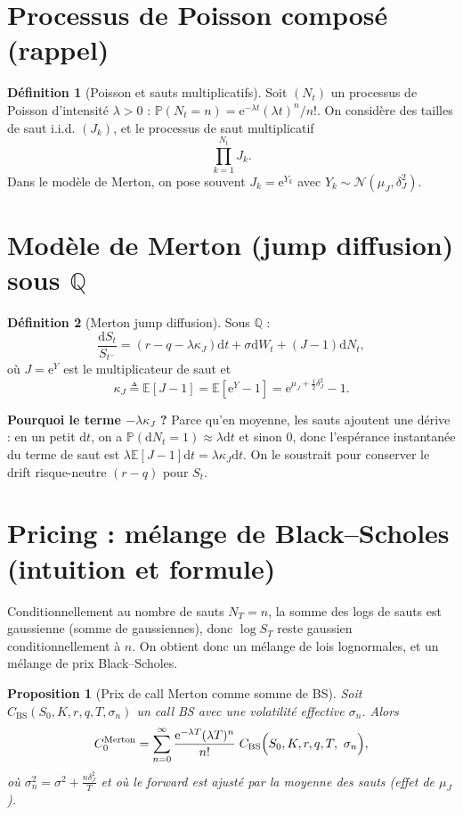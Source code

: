 \documentclass[11pt,a4paper]{report}
\newcommand{\dd}{\mathrm{d}}
\newcommand{\ee}{\mathrm{e}}
\newcommand{\E}{\mathbb{E}}
\newcommand{\Prob}{\mathbb{P}}
\newcommand{\Q}{\mathbb{Q}}
\newcommand{\1}{\mathbbm{1}}
\newcommand{\Normal}{\mathcal{N}}
\theoremstyle{definition}
\newtheorem{definition}{Définition}[chapter]
\theoremstyle{plain}
\newtheorem{proposition}{Proposition}[chapter]
\theoremstyle{remark}
\begin{document}
\section{Processus de Poisson composé (rappel)}
\begin{definition}[Poisson et sauts multiplicatifs]
Soit $(N_t)$ un processus de Poisson d'intensité $\lambda>0$ : $\Prob(N_t=n)=\ee^{-\lambda t}(\lambda t)^n/n!$.
On considère des tailles de saut i.i.d. $(J_k)$, et le processus de saut multiplicatif
\[
\prod_{k=1}^{N_t} J_k.
\]
Dans le modèle de Merton, on pose souvent $J_k=\ee^{Y_k}$ avec $Y_k\sim \Normal(\mu_J,\delta_J^2)$.
\end{definition}

\section{Modèle de Merton (jump diffusion) sous $\Q$}
\label{sec:merton_sde}
\begin{definition}[Merton jump diffusion]
Sous $\Q$ :
\[
\frac{\dd S_t}{S_{t^-}} = (r-q-\lambda \kappa_J)\dd t + \sigma \dd W_t + (J-1)\dd N_t,
\]
où $J=\ee^Y$ est le multiplicateur de saut et
\[
\kappa_J \triangleq \E[J-1] = \E[\ee^Y-1] = \ee^{\mu_J+\frac12\delta_J^2}-1.
\]
\end{definition}

\textbf{Pourquoi le terme $-\lambda\kappa_J$ ?}
Parce qu'en moyenne, les sauts ajoutent une dérive :
en un petit $\dd t$, on a $\Prob(\dd N_t=1)\approx \lambda \dd t$ et sinon 0,
donc l'espérance instantanée du terme de saut est $\lambda \E[J-1]\dd t = \lambda \kappa_J \dd t$.
On le soustrait pour conserver le drift risque-neutre $(r-q)$ pour $S_t$.

\section{Pricing : mélange de Black--Scholes (intuition et formule)}
Conditionnellement au nombre de sauts $N_T=n$, la somme des logs de sauts est gaussienne (somme de gaussiennes),
donc $\log S_T$ reste gaussien conditionnellement à $n$.
On obtient donc un mélange de lois lognormales, et un mélange de prix Black--Scholes.

\begin{proposition}[Prix de call Merton comme somme de BS]
Soit $C_{\mathrm{BS}}(S_0,K,r,q,T,\sigma_n)$ un call BS avec une volatilité effective $\sigma_n$.
Alors
\[
C_0^{\mathrm{Merton}}
=
\sum_{n=0}^{\infty} \frac{\ee^{-\lambda T}(\lambda T)^n}{n!}\;
C_{\mathrm{BS}}\Bigl(S_0,K,r,q,T,\ \sigma_n\Bigr),
\]
où $\sigma_n^2 = \sigma^2 + \frac{n\delta_J^2}{T}$ et où le forward est ajusté par la moyenne des sauts (effet de $\mu_J$).
\end{proposition}
\end{document}
